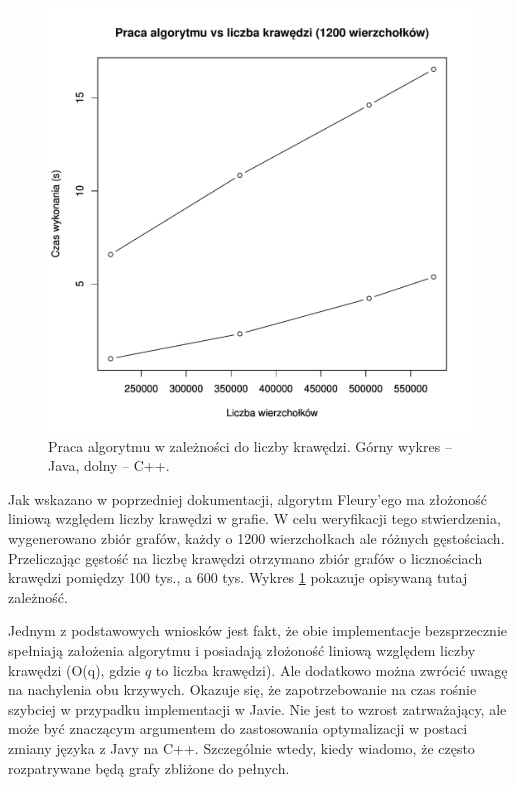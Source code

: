 \begin{figure}
\centering
\includegraphics[scale=0.7, trim=0mm 12mm 0mm 0mm, clip]{plots/algTime_vs_edges.pdf}
\caption{Praca algorytmu w zależności do liczby krawędzi. Górny wykres -- Java, dolny -- C++.}
\label{p:AlgTime_vs_edges}
\end{figure}

Jak wskazano w poprzedniej dokumentacji, algorytm Fleury'ego ma złożoność liniową względem liczby krawędzi w grafie. 
W celu weryfikacji tego stwierdzenia, wygenerowano zbiór grafów, każdy o 1200 wierzchołkach ale różnych gęstościach.
Przeliczając gęstość na liczbę krawędzi otrzymano zbiór grafów o licznościach krawędzi pomiędzy 100 tys., a 600 tys.
Wykres \ref{p:AlgTime_vs_edges} pokazuje opisywaną tutaj zależność. 

Jednym z podstawowych wniosków jest fakt, że obie implementacje bezsprzecznie spełniają założenia algorytmu i posiadają złożoność liniową względem liczby krawędzi (O(q), gdzie $q$ to liczba krawędzi).
Ale dodatkowo można zwrócić uwagę na nachylenia obu krzywych.
Okazuje się, że zapotrzebowanie na czas rośnie szybciej w przypadku implementacji w Javie.
Nie jest to wzrost zatrważający, ale może być znaczącym argumentem do zastosowania optymalizacji w postaci zmiany języka z Javy na C++.
Szczególnie wtedy, kiedy wiadomo, że często rozpatrywane będą grafy zbliżone do pełnych.


